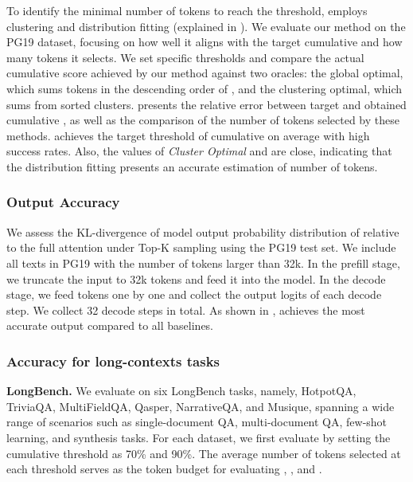 To identify the minimal number of tokens to reach the threshold, \sys employs clustering and distribution fitting (explained in ). We evaluate our method on the PG19 dataset, focusing on how well it aligns with the target cumulative \as{} and how many tokens it selects. We set specific \as{} thresholds and compare the actual cumulative score achieved by our method against two oracles: the global optimal, which sums tokens in the descending order of \as{}, and the clustering optimal, which sums \as{} from sorted clusters.
 presents the relative error between target and obtained cumulative \as{}, as well as the comparison of the number of tokens selected by these methods. \sys achieves the target threshold of cumulative \as{} on average with high success rates. Also, the values of \textit{Cluster Optimal} and \textit{\sys} are close, indicating that the distribution fitting presents an accurate estimation of number of tokens.

\subsubsection{Output Accuracy}
We assess the KL-divergence of model output probability distribution of \sys relative to the full attention under Top-K sampling using the PG19 test set\cite{rae2019compressivetransformerslongrangesequence}. 
We include all texts in PG19 with the number of tokens larger than 32k. In the prefill stage, we truncate the input to 32k tokens and feed it into the model. In the decode stage, we feed tokens one by one and collect the output logits of each decode step. We collect 32 decode steps in total. As shown in , \sys achieves the most accurate output compared to all baselines.


\subsubsection{Accuracy for long-contexts tasks}


\textbf{LongBench.}
We evaluate \sys on six LongBench tasks, namely, HotpotQA, TriviaQA, MultiFieldQA, Qasper, NarrativeQA, and Musique, spanning a wide range of scenarios such as single-document QA, multi-document QA, few-shot learning, and synthesis tasks. For each dataset, we first evaluate \sys by setting the cumulative \as{} threshold as 70\% and 90\%. The average number of tokens selected at each threshold serves as the token budget for evaluating \quest, \pyramid, and \adakv.

